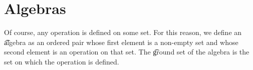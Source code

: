 \section*{Algebras}

Of course, any operation is defined on some set.
For this reason, we define an \t{algebra} as an ordered pair whose first element is a non-empty set and whose second element is an operation on that set.
The \t{ground set} of the algebra is the set on which the operation is defined.
